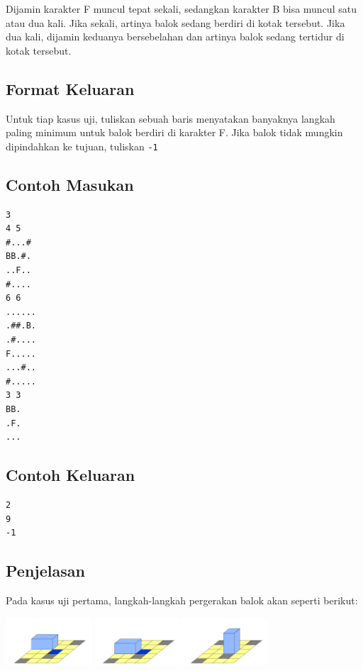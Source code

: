 \documentclass{article}
\begin{document}
Dijamin karakter F muncul tepat sekali, sedangkan karakter B bisa muncul satu atau dua kali. Jika sekali, artinya balok sedang berdiri di kotak tersebut. Jika dua kali, dijamin keduanya bersebelahan dan artinya balok sedang tertidur di kotak tersebut.

\subsection*{Format Keluaran}
Untuk tiap kasus uji, tuliskan sebuah baris menyatakan banyaknya langkah paling minimum untuk balok berdiri di karakter F. Jika balok tidak mungkin dipindahkan ke tujuan, tuliskan \lstinline{-1}
\\

\begin{multicols}{2}
\subsection*{Contoh Masukan}
\begin{lstlisting}
3
4 5
#...#
BB.#.
..F..
#....
6 6
......
.##.B.
.#....
F.....
...#..
#.....
3 3
BB.
.F.
...
\end{lstlisting}
\columnbreak
\subsection*{Contoh Keluaran}
\begin{lstlisting}
2
9
-1
\end{lstlisting}
\vfill
\null
\end{multicols}


\subsection*{Penjelasan}
Pada kasus uji pertama, langkah-langkah pergerakan balok akan seperti berikut:

\includegraphics[width=120px]{sample-1-1}
\includegraphics[width=120px]{sample-1-2}
\includegraphics[width=120px]{sample-1-3}

\pagebreak
\end{document}
